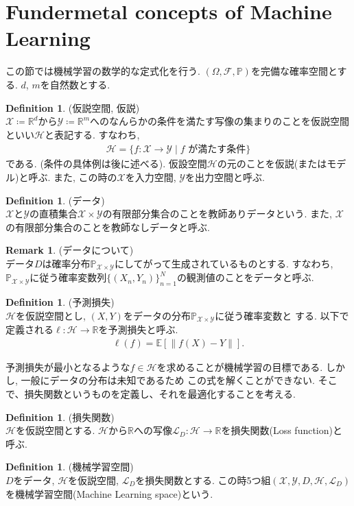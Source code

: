 \documentclass[11pt, a4paper, dvipdfmx]{jsarticle}
\theoremstyle{definition}
\newtheorem{Definition+}[Axiom+]{Definition}
\newtheorem{Remark+}[Axiom+]{Remark}
\newcommand{\R}{\mathbb{R}}
\newcommand{\F}{\mathcal{F}}
\newcommand{\X}{\mathcal{X}}
\newcommand{\Y}{\mathcal{Y}}
\newcommand{\Hil}{\mathcal{H}}
\newcommand{\Loss}{\mathcal{L}_{D}}
\newcommand{\MLsp}{(\X, \Y, D, \Hil, \Loss)}
\renewcommand{\P}{\mathbb{P}}
\newcommand{\Probsp}{(\Omega, \F, \P)}
\begin{document}
\section{Fundermetal concepts of Machine Learning}
この節では機械学習の数学的な定式化を行う. $\Probsp$を完備な確率空間とする.
$d$, $m$を自然数とする.
\begin{Definition+}(仮説空間, 仮説)\\
    $\X\coloneqq\R^d$から$\Y\coloneqq\R^m$へのなんらかの条件を満たす写像の集まりのことを仮説空間
    といい$\Hil$と表記する. すなわち,
    \begin{align*}
        \Hil = \{f:\X\to\Y\mid f\text{ が満たす条件}\}
    \end{align*}
    である. (条件の具体例は後に述べる). 仮設空間$\Hil$の元のことを仮説(またはモデル)と呼ぶ.
    また, この時の$\X$を入力空間, $\Y$を出力空間と呼ぶ. 
\end{Definition+}
\begin{Definition+}(データ)\\
    $\X$と$\Y$の直積集合$\X\times\Y$の有限部分集合のことを教師ありデータという.
    また, $\X$の有限部分集合のことを教師なしデータと呼ぶ. 
\end{Definition+}
\begin{Remark+}(データについて)\\
    データ$D$は確率分布$\mathbb{P}_{\X\times\Y}$にしてがって生成されているものとする. すなわち, 
    $\mathbb{P}_{\X\times\Y}$に従う確率変数列$\{(X_{n}, Y_{n})\}_{n = 1}^{N}$の観測値のことをデータと呼ぶ.
\end{Remark+}
\begin{Definition+}(予測損失)\\
    $\Hil$を仮説空間とし, $(X, Y)$をデータの分布$\mathbb{P}_{\X\times\Y}$に従う確率変数と
    する. 以下で定義される$\ell:\Hil\to\R$を予測損失と呼ぶ.
    \begin{align*}
        \ell(f) = \mathbb{E}[\|f(X) - Y\|].
    \end{align*}
\end{Definition+}
予測損失が最小となるような$f\in\Hil$を求めることが機械学習の目標である. しかし, 一般にデータの分布は未知であるため
この式を解くことができない. そこで、損失関数というものを定義し、それを最適化することを考える.
\begin{Definition+}(損失関数)\\
    $\Hil$を仮説空間とする. $\Hil$から$\R$への写像$\Loss:\Hil\to\R$を損失関数(Loss function)と呼ぶ.
\end{Definition+}
\begin{Definition+}(機械学習空間)\\
    $D$をデータ, $\Hil$を仮説空間, $\Loss$を損失関数とする. 
    この時5つ組$\MLsp$を機械学習空間(Machine Learning space)という.
\end{Definition+}
\end{document}
